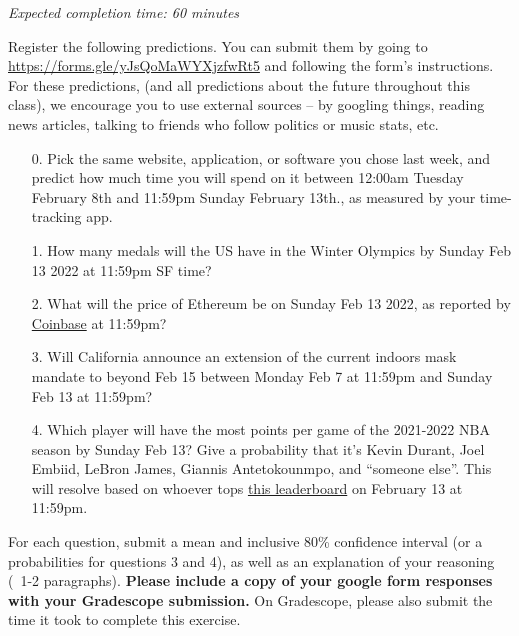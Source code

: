 \documentclass[11pt]{article}
\begin{document}
\emph{Expected completion time: 60 minutes}

Register the following predictions. You can submit them by going to \url{https://forms.gle/yJsQoMaWYXjzfwRt5} and following the form's instructions. For these predictions, (and all predictions about the future throughout this class), we encourage you to use external sources -- by googling things, reading news articles, talking to friends who follow politics or music stats, etc.

\begin{enumerate}
	\item[0.] Pick the same website, application, or software you chose last week, and predict how much time you will spend on it between 12:00am Tuesday February 8th and 11:59pm Sunday February 13th., as measured by your time-tracking app.

	\item[1.] How many medals will the US have in the Winter Olympics by Sunday Feb 13 2022 at 11:59pm SF time?
	
	\item[2.] What will the price of Ethereum be on Sunday Feb 13 2022, as reported by \href{https://www.coinbase.com/price/ethereum}{Coinbase} at 11:59pm?
 
	\item[3.] Will California announce an extension of the current indoors mask mandate to beyond Feb 15 between Monday Feb 7 at 11:59pm and Sunday Feb 13 at 11:59pm?
	
	\item[4.] Which player will have the most points per game of the 2021-2022 NBA season by Sunday Feb 13? Give a probability that it's Kevin Durant, Joel Embiid, LeBron James, Giannis Antetokounmpo, and ``someone else''. This will resolve based on whoever tops \href{https://www.nba.com/stats/players/traditional/?sort=PTS&dir=-1&Season=2021-22&SeasonType=Regular%20Season}{this leaderboard} on February 13 at 11:59pm.
\end{enumerate}

For each question, submit a mean and inclusive 80\% confidence interval (or a probabilities for questions 3 and 4), as well as an explanation of your reasoning (~1-2 paragraphs). \textbf{Please include a copy of your google form responses with your Gradescope submission.} On Gradescope, please also submit the time it took to complete this exercise.
\end{document}
